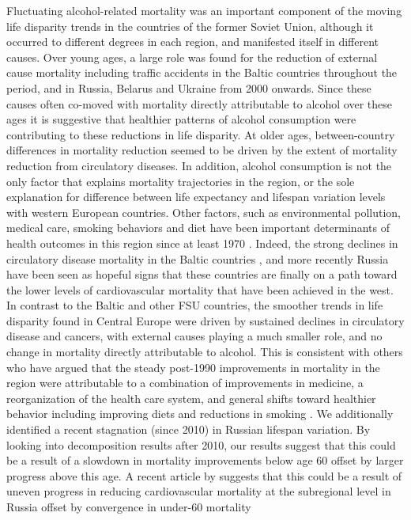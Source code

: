 \documentclass{article}
\begin{document}
\begin{spacing}{1.5}
Fluctuating alcohol-related mortality was an important component of the moving life disparity trends in the countries of the former Soviet Union, although it occurred to different degrees in each region, and manifested itself in different causes. Over young ages, a large role was found for the reduction of external cause mortality including traffic accidents in the Baltic countries throughout the period, and in Russia, Belarus and Ukraine from 2000 onwards. Since these causes often co-moved with mortality directly attributable to alcohol over these ages it is suggestive that healthier patterns of alcohol consumption were contributing to these reductions in life disparity. At older ages, between-country differences in mortality reduction seemed to be driven by the extent of mortality reduction from circulatory diseases. In addition, alcohol consumption is not the only factor that explains mortality trajectories in the region, or the sole explanation for difference between life expectancy and lifespan variation levels with western European countries. Other factors, such as environmental pollution, medical care, smoking behaviors and diet have been important determinants of health outcomes in this region since at least 1970 \citep{bobak1996east}. Indeed, the strong declines in circulatory disease mortality in the Baltic countries \citep{jasilionis2011}, and more recently Russia \citep{grigoriev2014recent} have been seen as hopeful signs that these countries are finally on a path toward the lower levels of cardiovascular mortality that have been achieved in the west. \\

In contrast to the Baltic and other FSU countries, the smoother trends in life disparity found in Central Europe were driven by sustained declines in circulatory disease and cancers, with external causes playing a much smaller role, and no change in mortality directly attributable to alcohol. This is consistent with others who have argued that the steady post-1990 improvements in mortality in the region were attributable to a combination of improvements in medicine, a reorganization of the health care system, and general shifts toward healthier behavior including improving diets and reductions in smoking \citep{pajkak2011cardiovascular, zatonski1998ecological, Fihel2017, cifkova2010, cooper1984rising, rychtarikova2004,nolte2000changingb,nolte2000changing}. We additionally identified a recent stagnation (since 2010) in Russian lifespan variation. By looking into decomposition results after 2010, our results suggest that this could be a result of a slowdown in mortality improvements below age 60 offset by larger progress above this age. A recent article by \cite{Timonin2017} suggests that this could be a result of uneven progress in reducing cardiovascular mortality at the subregional level in Russia offset by convergence in under-60 mortality \\ 


\end{spacing}
\end{document}
